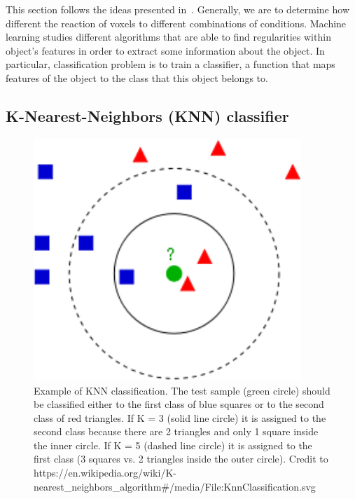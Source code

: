 
This section follows the ideas presented in~\cite{Kornysheva2014}. 
Generally, we are to determine how different the reaction of voxels to different combinations of conditions. 
Machine learning studies different algorithms that are able to find regularities within object's features in order to extract some information about the object. In particular, classification problem is to train a classifier, a function that maps features of the object to the class that this object belongs to. 

\subsection{K-Nearest-Neighbors (KNN) classifier}

\begin{figure}[ht]
\centering
\begin{minipage}[c]{0.3\textwidth}
\includegraphics[width=0.9\textwidth]{220px-KnnClassification.png}
\end{minipage}
\begin{minipage}[c]{0.6\textwidth}
\caption{Example of KNN classification. The test sample (green circle) should be classified either to the first class of blue squares or to the second class of red triangles. If K = 3 (solid line circle) it is assigned to the second class because there are 2 triangles and only 1 square inside the inner circle. If K = 5 (dashed line circle) it is assigned to the first class (3 squares vs. 2 triangles inside the outer circle). Credit to https://en.wikipedia.org/wiki/K-nearest\_neighbors\_algorithm\#/media/File:KnnClassification.svg}
\label{fig:knn_example}
\end{minipage}
\end{figure}

